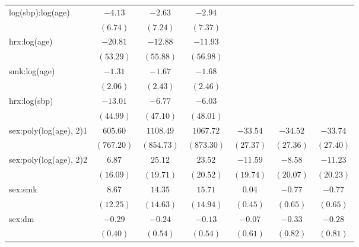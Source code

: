 \begin{tabular}{l c c c c c c}
log(sbp):log(age)                 & $-4.13$      & $-2.63$    & $-2.94$    &                &                &                \\
                                  & $(6.74)$     & $(7.24)$   & $(7.37)$   &                &                &                \\
hrx:log(age)                      & $-20.81$     & $-12.88$   & $-11.93$   &                &                &                \\
                                  & $(53.29)$    & $(55.88)$  & $(56.98)$  &                &                &                \\
smk:log(age)                      & $-1.31$      & $-1.67$    & $-1.68$    &                &                &                \\
                                  & $(2.06)$     & $(2.43)$   & $(2.46)$   &                &                &                \\
hrx:log(sbp)                      & $-13.01$     & $-6.77$    & $-6.03$    &                &                &                \\
                                  & $(44.99)$    & $(47.10)$  & $(48.01)$  &                &                &                \\
sex:poly(log(age), 2)1            & $605.60$     & $1108.49$  & $1067.72$  & $-33.54$       & $-34.52$       & $-33.74$       \\
                                  & $(767.20)$   & $(854.73)$ & $(873.30)$ & $(27.37)$      & $(27.36)$      & $(27.40)$      \\
sex:poly(log(age), 2)2            & $6.87$       & $25.12$    & $23.52$    & $-11.59$       & $-8.58$        & $-11.23$       \\
                                  & $(16.09)$    & $(19.71)$  & $(20.52)$  & $(19.74)$      & $(20.07)$      & $(20.23)$      \\
sex:smk                           & $8.67$       & $14.35$    & $15.71$    & $0.04$         & $-0.77$        & $-0.77$        \\
                                  & $(12.25)$    & $(14.63)$  & $(14.94)$  & $(0.45)$       & $(0.65)$       & $(0.65)$       \\
sex:dm                            & $-0.29$      & $-0.24$    & $-0.13$    & $-0.07$        & $-0.33$        & $-0.28$        \\
                                  & $(0.40)$     & $(0.54)$   & $(0.54)$   & $(0.61)$       & $(0.82)$       & $(0.81)$       \\

\end{tabular}
